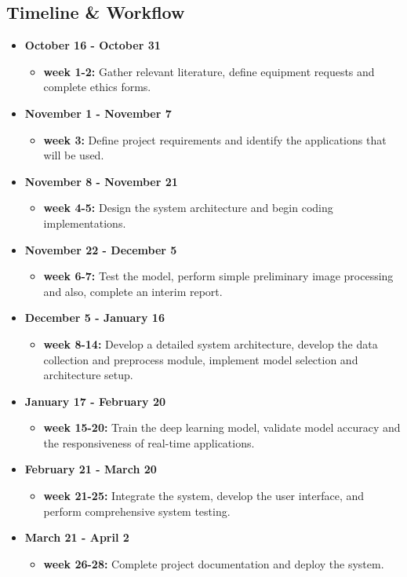 \documentclass[a4paper,12pt]{article}
\begin{document}
\subsection{Timeline \& Workflow}
\begin{itemize}
  \item \textbf{October 16 - October 31}
    \begin{itemize}
        \item \textbf{week 1-2:} Gather relevant literature, define equipment requests and complete ethics forms.
    \end{itemize}

    \item \textbf{November 1 - November 7}
    \begin{itemize}
        \item \textbf{week 3:} Define project requirements and identify the applications that will be used.
    \end{itemize}

    \item \textbf{November 8 - November 21}
    \begin{itemize}
        \item \textbf{week 4-5:}  Design the system architecture and begin coding implementations.
    \end{itemize}
    
    \item \textbf{November 22 - December 5}
    \begin{itemize}
        \item \textbf{week 6-7:}  Test the model, perform simple preliminary image processing and also, complete an interim report.
    \end{itemize}
    \item \textbf{December 5 - January 16}
    \begin{itemize}
        \item \textbf{week 8-14:}  Develop a detailed system architecture, develop the data collection and preprocess module, implement model selection and architecture setup.
    \end{itemize}
    \item \textbf{January 17 - February 20}
    \begin{itemize}
        \item \textbf{week 15-20:}  Train the deep learning model, validate model accuracy and the responsiveness of real-time applications.
    \end{itemize}
    \item \textbf{February 21 - March 20}
    \begin{itemize}
        \item \textbf{week 21-25:}  Integrate the system, develop the user interface, and perform comprehensive system testing.
    \end{itemize}
    \item \textbf{March 21 - April 2}
    \begin{itemize}
        \item \textbf{week 26-28:}  Complete project documentation and deploy the system.
    \end{itemize}


\end{itemize}
\end{document}
